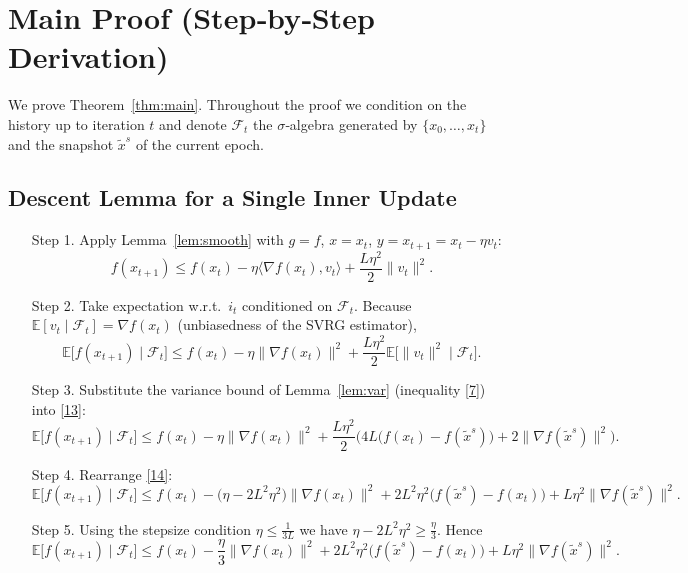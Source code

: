 \documentclass{article}
\newcommand{\E}{\mathbb{E}}
\begin{document}
\section*{Main Proof (Step‑by‑Step Derivation)}
We prove Theorem~\ref{thm:main}.  Throughout the proof we condition on the history up to iteration $t$ and denote $\mathcal{F}_t$ the $\sigma$‑algebra generated by $\{x_0,\dots,x_t\}$ and the snapshot $\tilde{x}^{s}$ of the current epoch.

\subsection*{Descent Lemma for a Single Inner Update}
\begin{enumerate}
\item[Step 1.] Apply Lemma~\ref{lem:smooth} with $g=f$, $x=x_t$, $y=x_{t+1}=x_t-\eta v_t$:
\[
f(x_{t+1})\le f(x_t)-\eta\langle\nabla f(x_t),v_t\rangle+\frac{L\eta^{2}}{2}\|v_t\|^{2}.
\tag{12}
\]
\item[Step 2.] Take expectation w.r.t.\ $i_t$ conditioned on $\mathcal{F}_t$.
Because $\E[v_t\mid\mathcal{F}_t]=\nabla f(x_t)$ (unbiasedness of the SVRG estimator),
\[
\E\!\big[f(x_{t+1})\mid\mathcal{F}_t\big]
\le f(x_t)-\eta\|\nabla f(x_t)\|^{2}
   +\frac{L\eta^{2}}{2}\E\!\big[\|v_t\|^{2}\mid\mathcal{F}_t\big].
\tag{13}
\]
\item[Step 3.] Substitute the variance bound of Lemma~\ref{lem:var} (inequality \eqref{7}) into \eqref{13}:
\[
\E\!\big[f(x_{t+1})\mid\mathcal{F}_t\big]
\le f(x_t)-\eta\|\nabla f(x_t)\|^{2}
   +\frac{L\eta^{2}}{2}\Big(4L\big(f(x_t)-f(\tilde{x}^{s})\big)+2\|\nabla f(\tilde{x}^{s})\|^{2}\Big).
\tag{14}
\]
\item[Step 4.] Rearrange \eqref{14}:
\[
\E\!\big[f(x_{t+1})\mid\mathcal{F}_t\big]
\le f(x_t)-\Big(\eta-\!2L^{2}\eta^{2}\Big)\|\nabla f(x_t)\|^{2}
   +2L^{2}\eta^{2}\big(f(\tilde{x}^{s})-f(x_t)\big)
   +L\eta^{2}\|\nabla f(\tilde{x}^{s})\|^{2}.
\tag{15}
\]
\item[Step 5.] Using the stepsize condition $\eta\le\frac{1}{3L}$ we have $\eta-2L^{2}\eta^{2}\ge\frac{\eta}{3}$. Hence
\[
\E\!\big[f(x_{t+1})\mid\mathcal{F}_t\big]
\le f(x_t)-\frac{\eta}{3}\|\nabla f(x_t)\|^{2}
   +2L^{2}\eta^{2}\big(f(\tilde{x}^{s})-f(x_t)\big)
   +L\eta^{2}\|\nabla f(\tilde{x}^{s})\|^{2}.
\tag{16}
\]
\end{enumerate}
\end{document}
